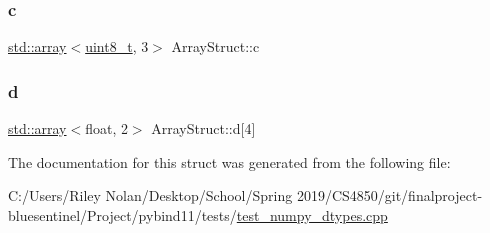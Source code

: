 \mbox{\label{struct_array_struct_a43ce42e67ad78bdae008a678cd25bf4b}} 
\subsubsection{\texorpdfstring{c}{c}}
{\footnotesize\ttfamily \mbox{\hyperlink{_s_d_l__opengl__glext_8h_a52f38e7d822a46377fde7a02708eedb1}{std\+::array}}$<$\mbox{\hyperlink{_s_d_l__config_8h_aba7bc1797add20fe3efdf37ced1182c5}{uint8\+\_\+t}}, 3$>$ Array\+Struct\+::c}

\mbox{\label{struct_array_struct_a9e593acba466a7c7cac1c487bc6e81a7}} 
\subsubsection{\texorpdfstring{d}{d}}
{\footnotesize\ttfamily \mbox{\hyperlink{_s_d_l__opengl__glext_8h_a52f38e7d822a46377fde7a02708eedb1}{std\+::array}}$<$float, 2$>$ Array\+Struct\+::d\mbox{[}4\mbox{]}}



The documentation for this struct was generated from the following file\+:\begin{DoxyCompactItemize}
\item 
C\+:/\+Users/\+Riley Nolan/\+Desktop/\+School/\+Spring 2019/\+C\+S4850/git/finalproject-\/bluesentinel/\+Project/pybind11/tests/\mbox{\hyperlink{test__numpy__dtypes_8cpp}{test\+\_\+numpy\+\_\+dtypes.\+cpp}}\end{DoxyCompactItemize}

